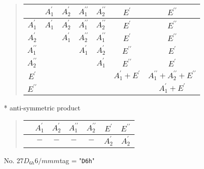 \documentclass[fleqn,10pt,landscape]{jsarticle}
\begin{document}
\begin{quote}
\begin{tabular}{c|cccccc} \hline \hline
 & $ A_{1}^{\prime} $ & $ A_{2}^{\prime} $ & $ A_{1}^{\prime\prime} $ & $ A_{2}^{\prime\prime} $ & $ E^{\prime} $ & $ E^{\prime\prime} $ \\ \hline
$ A_{1}^{\prime} $ & $ A_{1}^{\prime} $ & $ A_{2}^{\prime} $ & $ A_{1}^{\prime\prime} $ & $ A_{2}^{\prime\prime} $ & $ E^{\prime} $ & $ E^{\prime\prime} $ \\
$ A_{2}^{\prime} $ & $  $ & $ A_{1}^{\prime} $ & $ A_{2}^{\prime\prime} $ & $ A_{1}^{\prime\prime} $ & $ E^{\prime} $ & $ E^{\prime\prime} $ \\
$ A_{1}^{\prime\prime} $ & $  $ & $  $ & $ A_{1}^{\prime} $ & $ A_{2}^{\prime} $ & $ E^{\prime\prime} $ & $ E^{\prime} $ \\
$ A_{2}^{\prime\prime} $ & $  $ & $  $ & $  $ & $ A_{1}^{\prime} $ & $ E^{\prime\prime} $ & $ E^{\prime} $ \\
$ E^{\prime} $ & $  $ & $  $ & $  $ & $  $ & $ A_{1}^{\prime} + E^{\prime} $ & $ A_{1}^{\prime\prime} + A_{2}^{\prime\prime} + E^{\prime\prime} $ \\
$ E^{\prime\prime} $ & $  $ & $  $ & $  $ & $  $ & $  $ & $ A_{1}^{\prime} + E^{\prime} $ \\
 \hline \hline
\end{tabular}
\end{quote}
* anti-symmetric product
\begin{quote}
\begin{tabular}{ccccccc} \hline \hline
 & $ A_{1}^{\prime} $ & $ A_{2}^{\prime} $ & $ A_{1}^{\prime\prime} $ & $ A_{2}^{\prime\prime} $ & $ E^{\prime} $ & $ E^{\prime\prime} $ \\ \hline
$  $ & $ - $ & $ - $ & $ - $ & $ - $ & $ A_{2}^{\prime} $ & $ A_{2}^{\prime} $ \\
 \hline \hline
\end{tabular}
\end{quote}
\newpage
No. 27\quad$D_{6h}$\quad$6/mmm$\quad[ hexagonal ]
tag = "{\tt D6h}"
\end{document}
